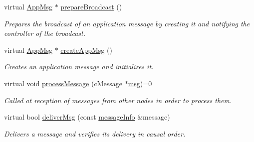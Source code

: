 \begin{DoxyCompactItemize}
virtual \hyperlink{class_app_msg}{App\+Msg} $\ast$ \hyperlink{class_node_base_a66c1dee9d15119bc3e68da71067ff6cd}{prepare\+Broadcast} ()
\begin{DoxyCompactList}\small\item\em Prepares the broadcast of an application message by creating it and notifying the controller of the broadcast. \end{DoxyCompactList}\item 
virtual \hyperlink{class_app_msg}{App\+Msg} $\ast$ \hyperlink{class_node_base_ac8b9e21b1cc32fd86aaa6c956b93a7c3}{create\+App\+Msg} ()
\begin{DoxyCompactList}\small\item\em Creates an application message and initializes it. \end{DoxyCompactList}\item 
virtual void \hyperlink{class_node_base_ae70b168f2bc7407c249594b1c614301c}{process\+Message} (c\+Message $\ast$\hyperlink{_controller_8h_afa0f3b802fbc219228f7bb97996fa558}{msg})=0
\begin{DoxyCompactList}\small\item\em Called at reception of messages from other nodes in order to process them. \end{DoxyCompactList}\item 
virtual bool \hyperlink{class_node_base_a49052382add1123da26db6bfb687d254}{deliver\+Msg} (const \hyperlink{structures_8h_a7e7bdc1d2fff8a9436f2f352b2711ed6}{message\+Info} \&message)
\begin{DoxyCompactList}\small\item\em Delivers a message and verifies its delivery in causal order. \end{DoxyCompactList}\end{DoxyCompactItemize}
